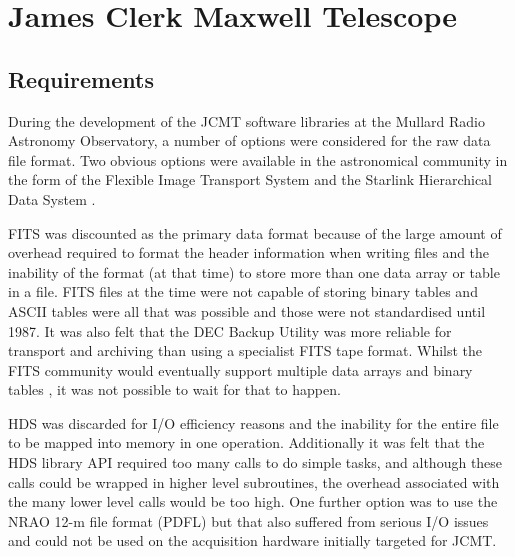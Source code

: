 \documentclass[final,authoryear,5p,times,twocolumn]{elsarticle}
\newcommand{\ascl}[1]{\href{http://www.ascl.net/#1}{ascl:#1}}
\begin{document}
\section{James Clerk Maxwell Telescope}

\subsection{Requirements}

During the development of the JCMT software libraries at the Mullard
Radio Astronomy Observatory, a number of options were considered for
the raw data file format.  Two obvious options were available in the
astronomical community in the form of the Flexible Image Transport System
\citep[FITS;][]{1981A&AS...44..363W} and the Starlink Hierarchical
Data System \citep[HDS;][\ascl{1502.009}]{1982QJRAS..23..485D,2015HDS}.

FITS was discounted as the primary data format because of the large
amount of overhead required to format the header information when
writing files and the inability of the format (at that time) to store
more than one data array or table in a file. FITS files at the time
were not capable of storing binary tables and ASCII tables were all
that was possible \citep{1988A&AS...73..365H} and those were not
standardised until 1987. It was also felt that the DEC Backup Utility
was more reliable for transport and archiving than using a specialist
FITS tape format. Whilst the FITS community would eventually support
multiple data arrays \citep{1988A&AS...73..359G} and binary tables
\citep{1995A&AS..113..159C}, it was not possible to wait for that to
happen.

HDS was discarded for I/O efficiency reasons and the inability for the
entire file to be mapped into memory in one operation. Additionally it
was felt that the HDS library API required too many calls to do simple
tasks, and although these calls could be wrapped in higher level
subroutines, the overhead associated with the many lower level calls
would be too high. One further option was to use the NRAO 12-m file format (PDFL)
but that also suffered from serious I/O issues and could not be used
on the acquisition hardware initially targeted for JCMT.
\end{document}
